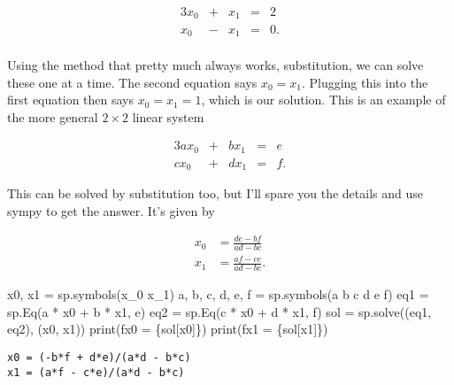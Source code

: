 \documentclass[
  letterpaper,
  DIV=11,
  numbers=noendperiod]{scrreprt}
\newenvironment{Shaded}{\begin{snugshade}}{\end{snugshade}}
\newcommand{\BuiltInTok}[1]{\textcolor[rgb]{0.00,0.23,0.31}{#1}}
\newcommand{\NormalTok}[1]{\textcolor[rgb]{0.00,0.23,0.31}{#1}}
\newcommand{\OperatorTok}[1]{\textcolor[rgb]{0.37,0.37,0.37}{#1}}
\newcommand{\SpecialCharTok}[1]{\textcolor[rgb]{0.37,0.37,0.37}{#1}}
\newcommand{\SpecialStringTok}[1]{\textcolor[rgb]{0.13,0.47,0.30}{#1}}
\newcommand{\StringTok}[1]{\textcolor[rgb]{0.13,0.47,0.30}{#1}}
\begin{document}
\begin{alignat*}{3}
   x_0 & {}+{} &  x_1 & {}={} & 2  \\
   x_0 & {}-{} &  x_1 & {}={} & 0. \\
\end{alignat*}

Using the method that pretty much always works, substitution, we can
solve these one at a time. The second equation says \(x_0 = x_1\).
Plugging this into the first equation then says \(x_0=x_1=1\), which is
our solution. This is an example of the more general \(2 \times 2\)
linear system

\begin{alignat*}{3}
   ax_0 & {}+{} &  bx_1 & {}={} & e \\
   cx_0 & {}+{} &  dx_1 & {}={} & f.
\end{alignat*}

This can be solved by substitution too, but I'll spare you the details
and use sympy to get the answer. It's given by

\begin{align*}
x_0 &= \frac{de-bf}{ad-bc} \\
x_1 &= \frac{af-ce}{ad-bc}.
\end{align*}

\begin{Shaded}
\begin{Highlighting}[]
\NormalTok{x0, x1 }\OperatorTok{=}\NormalTok{ sp.symbols(}\StringTok{\textquotesingle{}x\_0 x\_1\textquotesingle{}}\NormalTok{)}
\NormalTok{a, b, c, d, e, f }\OperatorTok{=}\NormalTok{ sp.symbols(}\StringTok{\textquotesingle{}a b c d e f\textquotesingle{}}\NormalTok{)}
\NormalTok{eq1 }\OperatorTok{=}\NormalTok{ sp.Eq(a }\OperatorTok{*}\NormalTok{ x0 }\OperatorTok{+}\NormalTok{ b }\OperatorTok{*}\NormalTok{ x1, e)}
\NormalTok{eq2 }\OperatorTok{=}\NormalTok{ sp.Eq(c }\OperatorTok{*}\NormalTok{ x0 }\OperatorTok{+}\NormalTok{ d }\OperatorTok{*}\NormalTok{ x1, f)}
\NormalTok{sol }\OperatorTok{=}\NormalTok{ sp.solve((eq1, eq2), (x0, x1))}
\BuiltInTok{print}\NormalTok{(}\SpecialStringTok{f\textquotesingle{}x0 = }\SpecialCharTok{\{}\NormalTok{sol[x0]}\SpecialCharTok{\}}\SpecialStringTok{\textquotesingle{}}\NormalTok{)}
\BuiltInTok{print}\NormalTok{(}\SpecialStringTok{f\textquotesingle{}x1 = }\SpecialCharTok{\{}\NormalTok{sol[x1]}\SpecialCharTok{\}}\SpecialStringTok{\textquotesingle{}}\NormalTok{)}
\end{Highlighting}
\end{Shaded}

\begin{verbatim}
x0 = (-b*f + d*e)/(a*d - b*c)
x1 = (a*f - c*e)/(a*d - b*c)
\end{verbatim}
\end{document}
